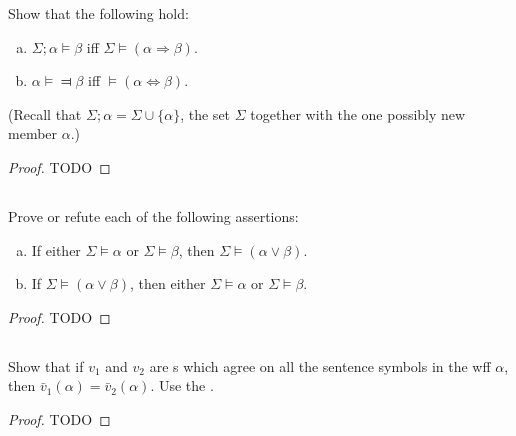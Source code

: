 \documentclass{report}
\begin{document}
  Show that the following hold:
    \begin{enumerate}[(a)]
      \item $\Sigma; \alpha \vDash \beta$ iff
        $\Sigma \vDash (\alpha \Rightarrow \beta)$.
      \item $\alpha \vDash \Dashv \beta$ iff
        $\vDash (\alpha \Leftrightarrow \beta)$.
    \end{enumerate}
  (Recall that $\Sigma; \alpha = \Sigma \cup \{\alpha\}$, the set $\Sigma$
    together with the one possibly new member $\alpha$.)

  \begin{proof}
    TODO
  \end{proof}

\subsection{}%

  Prove or refute each of the following assertions:
    \begin{enumerate}[(a)]
      \item If either $\Sigma \vDash \alpha$ or $\Sigma \vDash \beta$, then
        $\Sigma \vDash (\alpha \lor \beta)$.
      \item If $\Sigma \vDash (\alpha \lor \beta)$, then either
        $\Sigma \vDash \alpha$ or $\Sigma \vDash \beta$.
    \end{enumerate}

  \begin{proof}
    TODO
  \end{proof}

\subsection{}%

  Show that if $v_1$ and $v_2$ are s which agree
    on all the sentence symbols in the wff $\alpha$, then
    $\bar{v}_1(\alpha) = \bar{v}_2(\alpha)$.
  Use the .

  \begin{proof}
    TODO
  \end{proof}

\subsection{}%
\end{document}
